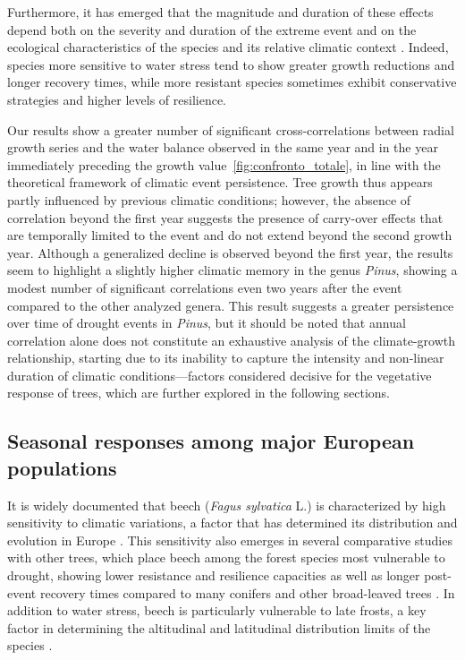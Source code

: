 \documentclass[12pt, a4paper]{article}
\begin{document}
Furthermore, it has emerged that the magnitude and duration of these effects depend both on the severity and duration of the extreme event and on the ecological characteristics of the species and its relative climatic context \parencite{vitasse2019, gazol2018}. Indeed, species more sensitive to water stress tend to show greater growth reductions and longer recovery times, while more resistant species sometimes exhibit conservative strategies and higher levels of resilience.

Our results show a greater number of significant cross-correlations between radial growth series and the water balance observed in the same year and in the year immediately preceding the growth value~\cref{fig:confronto_totale}, in line with the theoretical framework of climatic event persistence. Tree growth thus appears partly influenced by previous climatic conditions; however, the absence of correlation beyond the first year suggests the presence of carry-over effects that are temporally limited to the event and do not extend beyond the second growth year. Although a generalized decline is observed beyond the first year, the results seem to highlight a slightly higher climatic memory in the genus \textit{Pinus}, showing a modest number of significant correlations even two years after the event compared to the other analyzed genera. This result suggests a greater persistence over time of drought events in \textit{Pinus}, but it should be noted that annual correlation alone does not constitute an exhaustive analysis of the climate-growth relationship, starting due to its inability to capture the intensity and non-linear duration of climatic conditions—factors considered decisive for the vegetative response of trees, which are further explored in the following sections.


\subsection{Seasonal responses among major European populations}

It is widely documented that beech (\textit{Fagus sylvatica} L.) is characterized by high sensitivity to climatic variations, a factor that has determined its distribution and evolution in Europe \parencite{beloiuschwenke2024, leuschner2020}. This sensitivity also emerges in several comparative studies with other trees, which place beech among the forest species most vulnerable to drought, showing lower resistance and resilience capacities as well as longer post-event recovery times compared to many conifers and other broad-leaved trees \parencite{winterartusio2025}. In addition to water stress, beech is particularly vulnerable to late frosts, a key factor in determining the altitudinal and latitudinal distribution limits of the species \parencite{meyer2024}.
\end{document}
